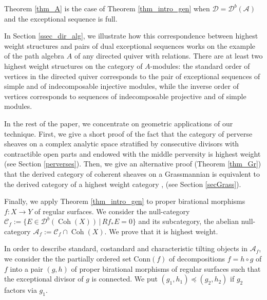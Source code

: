 \documentclass[12pt,a4paper]{amsart}
\newcommand{\f}{\varphi}
\newcommand{\aA}{{\mathcal{A}}}
\newcommand{\cC}{{\mathcal{C}}}
\newcommand{\dD}{{\mathcal{D}}}
\newcommand{\Coh}{\mathop{\operatorname{Coh}}\nolimits}
\theoremstyle{definition}
\begin{document}
Theorem \ref{thm_A} is the case of Theorem \ref{thm_intro_gen} when $\dD = \dD^b(\aA)$ and the exceptional sequence is full.

In Section \ref{ssec_dir_alg}, we illustrate how this correspondence between highest weight structures and pairs of dual exceptional sequences works on the example of the path algebra $A$ of any directed quiver with relations. There are at least two highest weight structures on the category of $A$-modules: the standard order of vertices in the directed quiver corresponds to the pair of exceptional sequences of simple and of indecomposable injective modules, while the inverse order of vertices corresponds to sequences of indecomposable projective and of simple modules.

In the rest of the paper, we concentrate on geometric applications of our technique. First, we give a short proof of the fact that the category of perverse sheaves on a complex analytic space stratified by consecutive divisors with contractible open parts and endowed with the middle perversity is highest weight \cite{MirVil, ParSco} (see Section \ref{perverses}). Then, we give an alternative proof (Theorem \ref{thm_Gr}) that the derived category of coherent sheaves on a Grassmannian is equivalent to the derived category of a highest weight category \cite{BuchLeuVdB} , \cite{Efi} (see Section \ref{secGrass}). 

Finally, we apply Theorem \ref{thm_intro_gen} to proper birational morphisms $f\colon X\to Y$ of regular surfaces. We consider the null-category $\cC_f := \{E\in \dD^b(\Coh(X))\,|\,Rf_* E=0\}$ and its subcategory, the abelian null-category $\mathscr{A}_f := \cC_f \cap \Coh(X)$. We prove that it is highest weight. 

In order to describe standard, costandard and characteristic tilting objects in $\mathscr{A}_f$, we consider the the partially ordered set $\textrm{Conn}(f)$ of decompositions $f = h \circ g$ of $f$ into a pair $(g,h)$  of proper birational morphisms of regular surfaces such that the exceptional divisor of $g$ is connected. We put $(g_1,h_1)\preceq (g_2, h_2)$ if $g_2$ factors via $g_1$.
\end{document}
